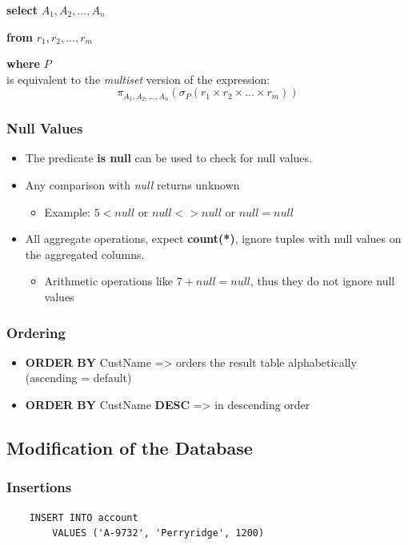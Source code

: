 \quad \textbf{select} $A_1,A_2,...,A_n$ \

\quad \textbf{from} $r_1, r_2,...,r_m$ \

\quad \textbf{where} $P$\\

is equivalent to the \textit{multiset} version of the expression: \[
\pi_{A_1,A_2,...,A_n}(\sigma_P (r_1 \times r_2 \times ... \times r_m))
\]

\subsubsection{Null Values}
\begin{itemize}[label=\(\rhd\)]
    \item The  predicate \textbf{is null} can be used to check for null values.
    \item Any comparison with \textit{null} returns unknown
    \begin{itemize}[label=\(\rhd\)]
        \item Example: $5<null$ or $null<>null$ or $null=null$ 
    \end{itemize}
    \item All aggregate operations, expect \textbf{count(*)}, ignore tuples with null values on the aggregated columns. 
    \begin{itemize}[label=\(\rhd\)]
        \item Arithmetic operations like $7+ null = null$, thus they do not ignore null values
    \end{itemize}
\end{itemize}

\subsubsection{Ordering}

\begin{itemize}[label=\(\rhd\)]
    \item \textbf{ORDER BY} CustName => orders the result table alphabetically (ascending = default)
    \item \textbf{ORDER BY} CustName \textbf{DESC} => in descending order
\end{itemize}

\subsection{Modification of the Database}

\subsubsection{Insertions}
\begin{lstlisting}
    INSERT INTO account
        VALUES ('A-9732', 'Perryridge', 1200)
\end{lstlisting}

